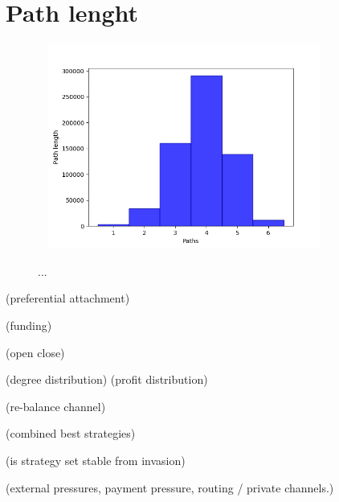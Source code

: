 \section{Path lenght}

\begin{figure}[!htb]
	\hspace*{-1cm}\ 
	\centering
	\includegraphics[width=9cm]{images/histogram_shortest_path.png}
	\caption{ ...
	}
	\label{fig:alloc}
	\hspace*{2mm}
\end{figure}



(preferential attachment)

(funding)

(open close)

(degree distribution)
(profit distribution)

(re-balance channel)

(combined best strategies)

(is strategy set stable from invasion)

(external pressures, payment pressure, routing / private channels.)